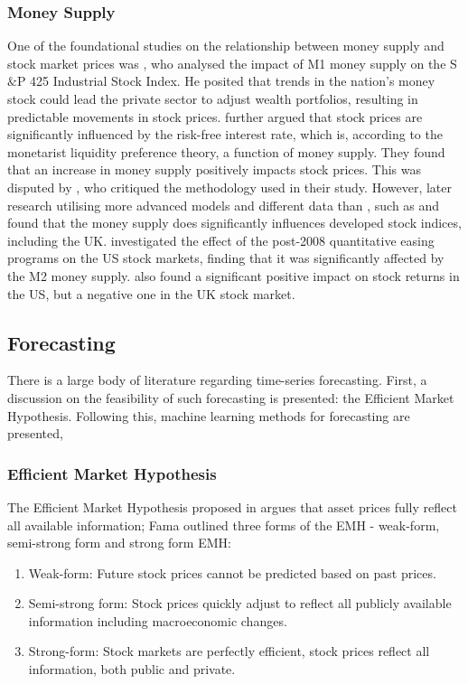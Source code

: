 \documentclass[11pt,a4paper]{article}
\newcommand{\citeboth}[1]{\citeauthor{#1} \citep{#1}}
\begin{document}
\subsubsection{Money Supply}

One of the foundational studies on the relationship between money supply and 
stock market prices was \citeboth{palmer1970}, who analysed the impact of M1 money supply on the S$\&$P 425 Industrial Stock Index. 
He posited that trends in the nation's money stock could lead the 
private sector to adjust wealth portfolios, resulting in 
predictable movements in stock prices. \citeboth{homa1971} further argued that 
stock prices are significantly influenced by the risk-free interest rate, 
which is, according to the monetarist liquidity preference theory, a 
function of money supply. They found that an increase in money supply 
positively impacts stock prices. This was disputed by \citeboth{pesando1974}, 
who critiqued the methodology used in their study. 
However, later research utilising more advanced models and different data than \citeboth{palmer1970}, such as \citeboth{bahloul2017} and 
\citeboth{synek2024} found that the money supply does significantly influences developed stock indices, including the UK. 
\citeboth{pícha2017}
investigated the effect of the post-2008 quantitative easing programs on the US stock markets, finding 
that it was significantly affected by the M2 money supply. 
\citeboth{olawale2014} also found a significant positive impact on stock returns in the US, but a negative one in the UK stock market. 


\subsection{Forecasting}

There is a large body of literature regarding time-series forecasting. First, 
a discussion on the feasibility of such forecasting is presented: the Efficient 
Market Hypothesis. Following this, machine learning methods for forecasting are 
presented, 

\subsubsection{Efficient Market Hypothesis}

The Efficient Market Hypothesis proposed in \citeboth{fama1970} argues that asset prices fully 
reflect all available information; Fama outlined three forms of the EMH - 
weak-form, semi-strong form and strong form EMH:
\begin{enumerate}
    \item Weak-form: Future stock prices cannot be predicted based on past prices.
    \item Semi-strong form: Stock prices quickly adjust to reflect all publicly available information including macroeconomic changes.  
    \item Strong-form: Stock markets are perfectly efficient, stock prices reflect all information, both public and private.
\end{enumerate}
\end{document}
